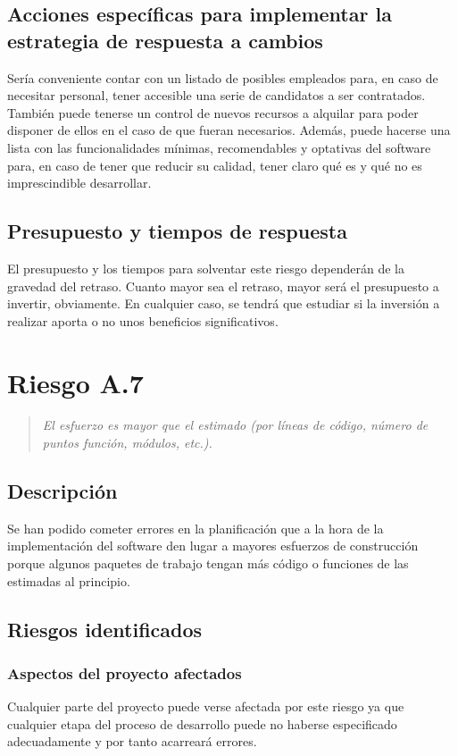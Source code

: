 \documentclass[11pt,a4paper,spanish,twoside]{book}
\begin{document}
\subsection{Acciones específicas para implementar la estrategia de respuesta
  a cambios}
Sería conveniente contar con un listado de posibles empleados para, en caso
de necesitar personal, tener accesible una serie de candidatos a ser
contratados. También puede tenerse un control de nuevos recursos a alquilar
para poder disponer de ellos en el caso de que fueran necesarios. Además,
puede hacerse una lista con las funcionalidades mínimas, recomendables y
optativas del software para, en caso de tener que reducir su calidad, tener
claro qué es y qué no es imprescindible desarrollar.

\subsection{Presupuesto y tiempos de respuesta}
El presupuesto y los tiempos para solventar este riesgo dependerán de la
gravedad del retraso. Cuanto mayor sea el retraso, mayor será el presupuesto
a invertir, obviamente. En cualquier caso, se tendrá que estudiar si la
inversión a realizar aporta o no unos beneficios significativos.

\section{Riesgo A.7}
\begin{quote}
\emph{El esfuerzo es mayor que el estimado (por líneas de código, número de
  puntos función, módulos, etc.).}
\end{quote}

\subsection{Descripción}
Se han podido cometer errores en la planificación que a la hora de la
implementación del software den lugar a mayores esfuerzos de construcción
porque algunos paquetes de trabajo tengan más código o funciones de las
estimadas al principio.

\subsection{Riesgos identificados}
\subsubsection{Aspectos del proyecto afectados}
Cualquier parte del proyecto puede verse afectada por este riesgo ya que
cualquier etapa del proceso de desarrollo puede no haberse especificado
adecuadamente y por tanto acarreará errores.
\end{document}
